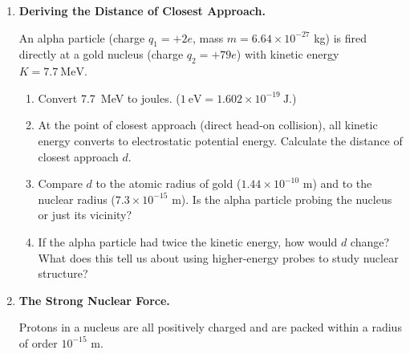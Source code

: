 \documentclass[12pt, a4paper]{book}
\theoremstyle{definition}
\begin{document}
\begin{deepbox}
\begin{enumerate}[label=\textbf{D\arabic*.}]

  \item \textbf{Deriving the Distance of Closest Approach.}

        An alpha particle (charge $q_1 = +2e$, mass
        $m = 6.64\times10^{-27}$ kg) is fired directly at
        a gold nucleus (charge $q_2 = +79e$) with kinetic
        energy $K = \SI{7.7}{\mega\electronvolt}$.

        \begin{enumerate}[label=(\alph*)]
          \item Convert \SI{7.7}{\mega\electronvolt} to joules.
                ($\SI{1}{\electronvolt} = 1.602\times10^{-19}\ \si{\joule}$.)
          \item At the point of closest approach (direct
                head-on collision), all kinetic energy converts
                to electrostatic potential energy.
                Calculate the distance of closest approach $d$.
          \item Compare $d$ to the atomic radius of gold
                ($1.44\times10^{-10}$ m) and to the nuclear
                radius ($7.3\times10^{-15}$ m).
                Is the alpha particle probing the nucleus
                or just its vicinity?
          \item If the alpha particle had twice the kinetic energy,
                how would $d$ change?
                What does this tell us about using higher-energy
                probes to study nuclear structure?
        \end{enumerate}

  \item \textbf{The Strong Nuclear Force.}

        Protons in a nucleus are all positively charged
        and are packed within a radius of order $10^{-15}$ m.


\end{enumerate}
\end{deepbox}
\end{document}
